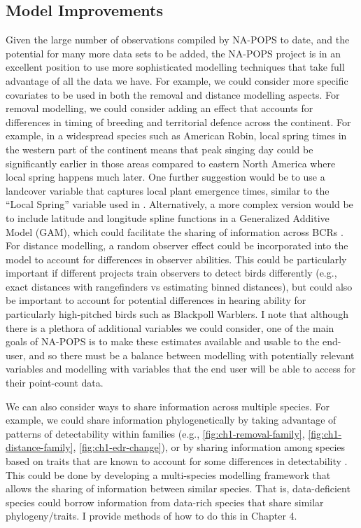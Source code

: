 \subsection{Model Improvements}
\par Given the large number of observations compiled by NA-POPS to date, and the potential for many more data sets to be added, the NA-POPS project is in an excellent position to use more sophisticated modelling techniques that take full advantage of all the data we have. For example, we could consider more specific covariates to be used in both the removal and distance modelling aspects. For removal modelling, we could consider adding an effect that accounts for differences in timing of breeding and territorial defence across the continent. For example, in a widespread species such as American Robin, local spring times in the western part of the continent means that peak singing day could be significantly earlier in those areas compared to eastern North America where local spring happens much later. One further suggestion would be to use a landcover variable that captures local plant emergence times, similar to the “Local Spring” variable used in \citet{solymos_evaluating_2018}. Alternatively, a more complex version would be to include latitude and longitude spline functions in a Generalized Additive Model (GAM), which could facilitate the sharing of information across BCRs \citep{crainiceanu_bayesian_2005, wood_generalized_2017, pedersen_hierarchical_2019}. For distance modelling, a random observer effect could be incorporated into the model to account for differences in observer abilities. This could be particularly important if different projects train observers to detect birds differently (e.g., exact distances with rangefinders vs estimating binned distances), but could also be important to account for potential differences in hearing ability for particularly high-pitched birds such as Blackpoll Warblers. I note that although there is a plethora of additional variables we could consider, one of the main goals of NA-POPS is to make these estimates available and usable to the end-user, and so there must be a balance between modelling with potentially relevant variables and modelling with variables that the end user will be able to access for their point-count data.

\par We can also consider ways to share information across multiple species. For example, we could share information phylogenetically by taking advantage of patterns of detectability within families (e.g., \autoref{fig:ch1-removal-family}, \autoref{fig:ch1-distance-family}, \autoref{fig:ch1-edr-change}), or by sharing information among species based on traits that are known to account for some differences in detectability \citep{johnston_species_2014, solymos_phylogeny_2018}. This could be done by developing a multi-species modelling framework that allows the sharing of information between similar species. That is, data-deficient species could borrow information from data-rich species that share similar phylogeny/traits.
I provide methods of how to do this in Chapter 4.

